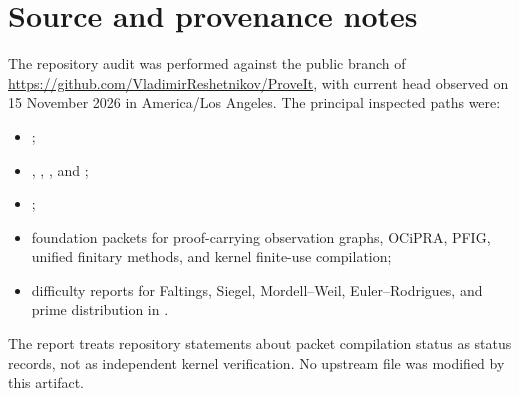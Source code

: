 \section{Source and provenance notes}

The repository audit was performed against the public  branch of
\url{https://github.com/VladimirReshetnikov/ProveIt}, with current head
 observed on 15 November 2026 in America/Los Angeles.  The principal inspected paths were:

\begin{itemize}
\item {};
\item {}\newline
      , , , and ;
\item {};
\item foundation packets for proof-carrying observation graphs, OCiPRA, PFIG, unified finitary methods, and kernel finite-use compilation;
\item difficulty reports for Faltings, Siegel, Mordell--Weil, Euler--Rodrigues, and prime distribution in \iPRA.
\end{itemize}

The report treats repository statements about packet compilation status as status records, not as independent kernel verification.  No upstream file was modified by this artifact.

